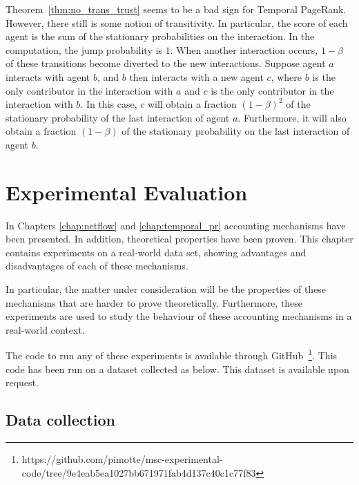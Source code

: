 \documentclass[a4paper,11pt]{book}
\theoremstyle{definition}
\begin{document}
Theorem~\ref{thm:no_trans_trust} seems to be a bad sign for Temporal PageRank. However, 
there still is some notion of transitivity. In particular, the score of each agent
is the sum of the stationary probabilities on the interaction. In the computation, 
the jump probability is $1$. When another interaction occurs, $1-\beta$ of these
transitions become diverted to the new interactions. Suppose agent $a$ interacts
with agent $b$, and $b$ then interacts with a new agent $c$, where $b$ is the only
contributor in the interaction with $a$ and $c$ is the only contributor in
the interaction with $b$. In this case, $c$ will obtain a fraction $(1-\beta)^2$ of
the stationary probability of the last interaction of agent $a$. Furthermore, it will
also obtain a fraction $(1-\beta)$ of the stationary probability on the last interaction
of agent $b$.










\chapter{Experimental Evaluation}
\label{chap:exp}

In Chapters \ref{chap:netflow} and \ref{chap:temporal_pr} accounting mechanisms have been presented.
In addition, theoretical properties have been proven. This chapter contains experiments on a real-world
data set, showing advantages and disadvantages of each of these mechanisms.

In particular, the matter under consideration will be the properties of these mechanisms that are
harder to prove theoretically. Furthermore, these experiments are used to study the behaviour
of these accounting mechanisms in a real-world context.

The code to run any of these experiments is available through 
GitHub~\footnote{https://github.com/pimotte/msc-experimental-code/tree/9e4eab5ea1027bb671971fab4d137c40c1c77f83}.
This code has been run on a dataset collected as below. This dataset is available upon request.


\section{Data collection}
\end{document}
